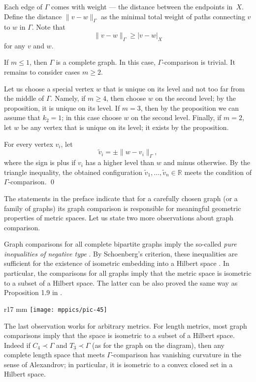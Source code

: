 \documentclass{article}
\def\parbf#1{\medskip\noindent{\bf #1}}
\def\qeds{\qed\par\medskip}
\begin{document}
Each edge of $\Gamma$ comes with weight --- the distance between the endpoints in~$X$.
Define the distance $\|v-w\|_\Gamma$ as the minimal total weight of paths connecting $v$ to $w$ in $\Gamma$.
Note that 
\[\|v-w\|_\Gamma\geqslant |v-w|_X\]
for any $v$ and $w$.

If $m\leqslant 1$, then $\Gamma$ is a complete graph.
In this case, $\Gamma$-comparison is trivial.
It remains to consider cases $m\geqslant2$.

Let us choose a special vertex $w$ that is unique on its level and not too far from the middle of $\Gamma$.
Namely, if $m\geqslant 4$, then choose $w$ on the second level;
by the proposition, it is unique on its level.
If $m=3$, then by the proposition we can assume that $k_2=1$; in this case choose $w$ on the second level.
Finally, if $m=2$, let $w$ be any vertex that is unique on its level; it exists by the proposition. 

For every vertex $v_i$, let
\[\tilde v_i=\pm \|w-v_i\|_\Gamma,\]
where the sign is plus if $v_i$ has a higher level than $w$ and minus otherwise.
By the triangle inequality, the obtained configuration $\tilde v_1,\dots,\tilde v_n\in\mathbb{R}$ meets the condition of $\Gamma$-comparison.
\qeds

\parbf{Remarks.}
The statements in the preface indicate that for a carefully chosen graph (or a family of graphs) its graph comparison is responsible for meaningful geometric properties of metric spaces.
Let us state two more observations about graph comparison.

Graph comparisons for all complete bipartite graphs imply the so-called \emph{pure inequalities of negative type} \cite[6.1.1]{deza-laurent}.
By Schoenberg's criterion, these inequalities are sufficient for the existence of isometric embedding into a Hilbert space \cite[6.2.1]{deza-laurent}.
In particular, the comparisons for all graphs imply that the metric space is isometric to a subset of a Hilbert space.
The latter can be also proved the same way as Proposition 1.9 in \cite{toyoda}.

\begin{wrapfigure}{r}{17 mm}
\vskip-6mm
\centering
\texttt{[image: mppics/pic-45]}
\vskip-2mm
\end{wrapfigure}

The last observation works for arbitrary metrics.
For length metrics, most graph comparisons imply that the space is isometric to a subset of a Hilbert space.
Indeed if $C_4\prec\Gamma$ and $T_3\prec\Gamma$ (as for the graph on the diagram), then any complete length space that meets $\Gamma$-comparison has vanishing curvature in the sense of Alexandrov; in particular, it is isometric to a convex closed set in a Hilbert space.
\end{document}
